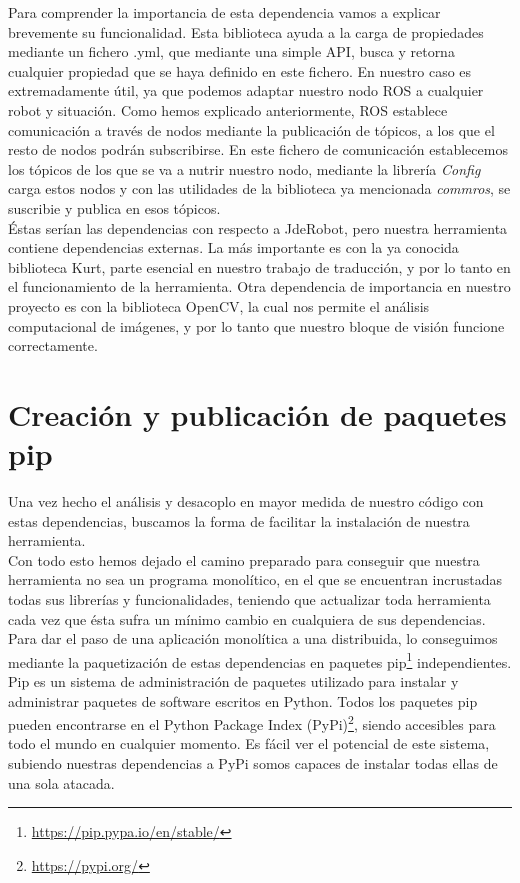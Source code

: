 Para comprender la importancia de esta dependencia vamos a explicar brevemente su funcionalidad. Esta biblioteca ayuda a la carga de propiedades mediante un fichero .yml, que mediante una simple API, busca y retorna cualquier propiedad que se haya definido en este fichero. En nuestro caso es extremadamente útil, ya que podemos adaptar nuestro nodo ROS a cualquier robot y situación. Como hemos explicado anteriormente, ROS establece comunicación a través de nodos mediante la publicación de tópicos, a los que el resto de nodos podrán subscribirse. En este fichero de comunicación establecemos los tópicos de los que se va a nutrir nuestro nodo, mediante la librería \textit{Config} carga estos nodos y con las utilidades de la biblioteca ya mencionada \textit{commros}, se suscribie y publica en esos tópicos.\\

Éstas serían las dependencias con respecto a JdeRobot, pero nuestra herramienta contiene dependencias externas. La más importante es con la ya conocida biblioteca Kurt, parte esencial en nuestro trabajo de traducción, y por lo tanto en el funcionamiento de la herramienta. Otra dependencia de importancia en nuestro proyecto es con la biblioteca OpenCV, la cual nos permite el análisis computacional de imágenes, y por lo tanto que nuestro bloque de visión funcione correctamente.

\section{Creación y publicación de paquetes pip}
\label{sec:pip}
Una vez hecho el análisis y desacoplo en mayor medida de nuestro código con estas dependencias, buscamos la forma de facilitar la instalación de nuestra herramienta.\\

Con todo esto hemos dejado el camino preparado para conseguir que nuestra herramienta no sea un programa monolítico, en el que se encuentran incrustadas todas sus librerías y funcionalidades, teniendo que actualizar toda herramienta cada vez que ésta sufra un mínimo cambio en cualquiera de sus dependencias. \\

Para dar el paso de una aplicación monolítica a una distribuida, lo conseguimos mediante la paquetización de estas dependencias en paquetes pip\footnote{\url{https://pip.pypa.io/en/stable/}} independientes.\\

Pip es un sistema de administración de paquetes utilizado para instalar y administrar paquetes de software escritos en Python. Todos los paquetes pip pueden encontrarse en el Python Package Index (PyPi)\footnote{\url{https://pypi.org/}}, siendo accesibles para todo el mundo en cualquier momento. Es fácil ver el potencial de este sistema, subiendo nuestras dependencias a PyPi somos capaces de instalar todas ellas de una sola atacada.\\

